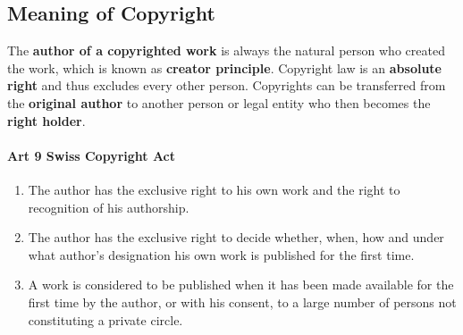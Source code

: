 \documentclass[11pt]{article}
\theoremstyle{definition}
\begin{document}
\subsection{Meaning of Copyright}
The \textbf{author of a copyrighted work} is always the natural person who created the work, which is known as \textbf{creator principle}.	Copyright law is an \textbf{absolute right} and thus excludes every other person. Copyrights can be transferred from the \textbf{original author} to another person or legal entity who then becomes the \textbf{right holder}.

\paragraph{Art 9 Swiss Copyright Act}
\begin{enumerate}[label=\arabic*]
	\item The author has the exclusive right to his own work and the right to recognition of his authorship.
	\item The author has the exclusive right to decide whether, when, how and under what author's designation his own work is published for the first time.
	\item A work is considered to be published when it has been made available for the first time by the author, or with his consent, to a large number of persons not constituting a private circle.
\end{enumerate}
\end{document}
